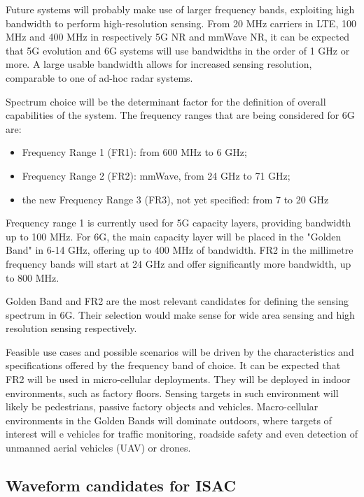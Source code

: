 	Future systems will probably make use of larger frequency bands, exploiting high bandwidth to perform high-resolution sensing. From 20 MHz carriers in LTE, 100 MHz and 400 MHz in respectively 5G NR and mmWave NR, it can be expected that 5G evolution and 6G systems will use bandwidths in the order of 1 GHz or more. A large usable bandwidth allows for increased sensing resolution, comparable to one of ad-hoc radar systems.
	
	Spectrum choice will be the determinant factor for the definition of overall capabilities of the system. The frequency ranges that are being considered for 6G \cite{Hexa} are:
	
	\begin{itemize}
		\item Frequency Range 1 (FR1): from 600 MHz to 6 GHz;
		\item Frequency Range 2 (FR2): mmWave, from 24 GHz to 71 GHz;
		\item the new Frequency Range 3 (FR3), not yet specified: from 7 to 20 GHz
	\end{itemize}
	
	Frequency range 1 is currently used for 5G capacity layers, providing bandwidth up to 100 MHz. For 6G, the main capacity layer will be placed in the "Golden Band" in 6-14 GHz, offering up to 400 MHz of bandwidth. FR2 in the millimetre frequency bands will start at 24 GHz and offer significantly more bandwidth, up to 800 MHz.
	
	Golden Band and FR2 are the most relevant candidates for defining the sensing spectrum in 6G. Their selection would make sense for wide area sensing and high resolution sensing respectively.
	
	Feasible use cases and possible scenarios will be driven by the characteristics and specifications offered by the frequency band of choice. It can be expected that FR2 will be used in micro-cellular deployments. They will be deployed in indoor environments, such as factory floors. Sensing targets in such environment will likely be pedestrians, passive factory objects and vehicles.
	Macro-cellular environments in the Golden Bands will dominate outdoors, where targets of interest will e vehicles for traffic monitoring, roadside safety and even detection of unmanned aerial vehicles (UAV) or drones.
	
	\subsection{Waveform candidates for ISAC}
	

